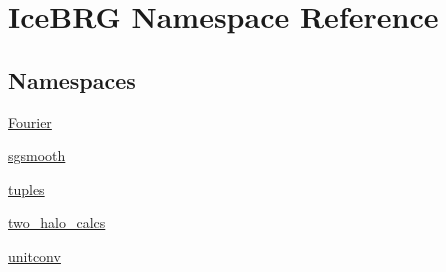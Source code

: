 \hypertarget{namespaceIceBRG}{}\section{Ice\+B\+R\+G Namespace Reference}
\label{namespaceIceBRG}
\subsection*{Namespaces}
\begin{DoxyCompactItemize}
\item 
 \hyperlink{namespaceIceBRG_1_1Fourier}{Fourier}
\item 
 \hyperlink{namespaceIceBRG_1_1sgsmooth}{sgsmooth}
\item 
 \hyperlink{namespaceIceBRG_1_1tuples}{tuples}
\item 
 \hyperlink{namespaceIceBRG_1_1two__halo__calcs}{two\+\_\+halo\+\_\+calcs}
\item 
 \hyperlink{namespaceIceBRG_1_1unitconv}{unitconv}
\end{DoxyCompactItemize}
